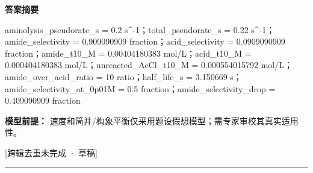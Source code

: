 \documentclass[UTF8,11pt,a4paper]{ctexart}
\begin{document}
\noindent\textbf{答案摘要}\par
aminolysis\_pseudorate\_s = 0.2 s\textasciicircum{}-1；total\_pseudorate\_s = 0.22 s\textasciicircum{}-1；amide\_selectivity = 0.909090909 fraction；acid\_selectivity = 0.0909090909 fraction；amide\_t10\_M = 0.00404180383 mol/L；acid\_t10\_M = 0.000404180383 mol/L；unreacted\_AcCl\_t10\_M = 0.000554015792 mol/L；amide\_over\_acid\_ratio = 10 ratio；half\_life\_s = 3.150669 s；amide\_selectivity\_at\_0p01M = 0.5 fraction；amide\_selectivity\_drop = 0.409090909 fraction\par
\noindent\textbf{模型前提：}
速度和简并/构象平衡仅采用题设假想模型；需专家审校其真实适用性。\par
\noindent\textcolor{red!65!black}{[跨辑去重未完成 · 草稿]} \par
\medskip\hrule\medskip
{}
\end{document}
